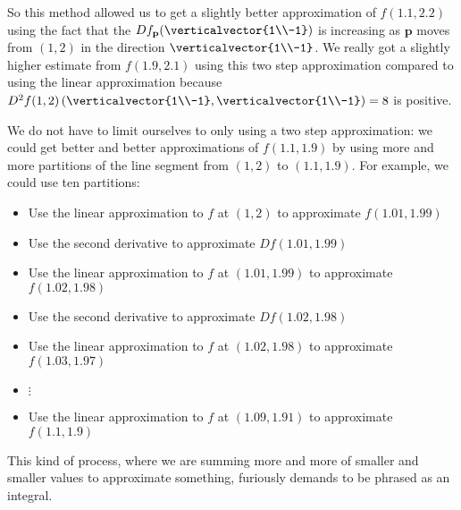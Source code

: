 \documentclass{ximera}
\begin{document}
\begin{question}
		So this method allowed us to get a slightly better approximation of $f(1.1,2.2)$ using the fact that the $Df_{\mathbf{p}}(\verticalvector{1\\-1})$ is increasing
		as $\mathbf{p}$ moves from $(1,2)$ in the direction $\verticalvector{1\\-1}$.  We really got a slightly higher estimate from $f(1.9,2.1)$ using this two step
		approximation compared to using the linear approximation because 
		$D^2f(1,2)\left(\verticalvector{1\\-1},\verticalvector{1\\-1} \right) = 8$ is positive.  
		
		We do not have to limit ourselves to only using a two step approximation:  we could get better and better approximations of $f(1.1,1.9)$
		by using more and more partitions of the line segment from $(1,2)$ to $(1.1,1.9)$.  For example, we could use ten partitions:
		\begin{itemize}
			\item Use the linear approximation to $f$ at $(1,2)$ to approximate $f(1.01,1.99)$
			\item Use the second derivative to approximate $Df(1.01,1.99)$
			\item Use the linear approximation to $f$ at $(1.01,1.99)$ to approximate $f(1.02,1.98)$
			\item Use the second derivative to approximate $Df(1.02,1.98)$
			\item Use the linear approximation to $f$ at $(1.02,1.98)$ to approximate $f(1.03,1.97)$
			\item $\vdots$
			\item  Use the linear approximation to $f$ at $(1.09,1.91)$ to approximate $f(1.1,1.9)$
		\end{itemize}
		
		This kind of process, where we are summing more and more of smaller and smaller values to approximate something, 
		furiously demands to be phrased as an integral.
		

\end{question}
\end{document}
